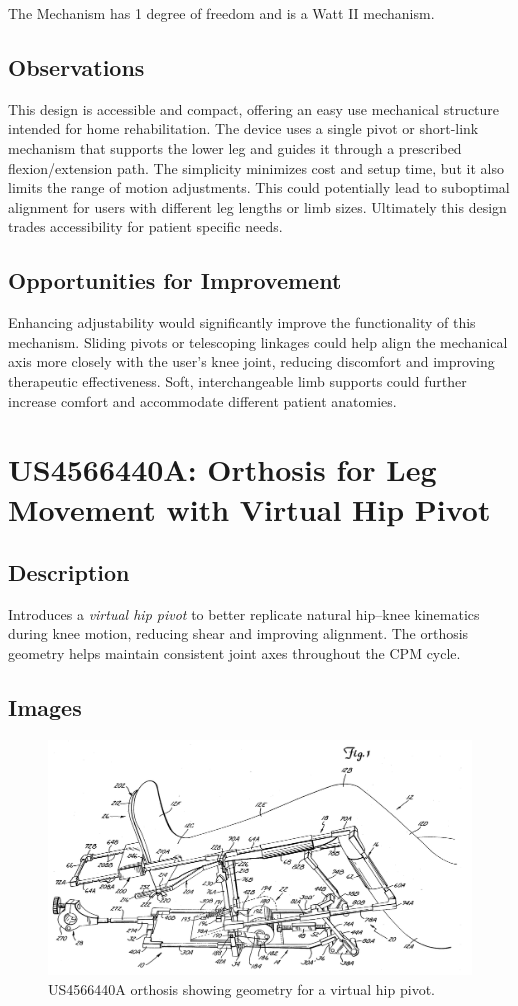 \documentclass[11pt]{article}
\begin{document}
The Mechanism has 1 degree of freedom and is a Watt II mechanism.

\subsection{Observations}
This design is accessible and compact, offering an easy use mechanical structure intended for home rehabilitation. The device uses a single pivot or short-link mechanism that supports the lower leg and guides it through a prescribed flexion/extension path. The simplicity minimizes cost and setup time, but it also limits the range of motion adjustments. This could potentially lead to suboptimal alignment for users with different leg lengths or limb sizes. Ultimately this design trades accessibility for patient specific needs.

\subsection{Opportunities for Improvement}
Enhancing adjustability would significantly improve the functionality of this mechanism. Sliding pivots or telescoping linkages could help align the mechanical axis more closely with the user's knee joint, reducing discomfort and improving therapeutic effectiveness. Soft, interchangeable limb supports could further increase comfort and accommodate different patient anatomies.

\section{US4566440A: Orthosis for Leg Movement with Virtual Hip Pivot}
\subsection{Description}
Introduces a \emph{virtual hip pivot} to better replicate natural hip–knee kinematics during knee motion, reducing shear and improving alignment. The orthosis geometry helps maintain consistent joint axes throughout the CPM cycle.
\subsection{Images}
\begin{figure}[H]
  \centering
  \includegraphics[width=0.54\linewidth]{US4566440_1.png}
  \caption{US4566440A orthosis showing geometry for a virtual hip pivot.}
  \label{fig:US4566440A}
\end{figure}
\end{document}
